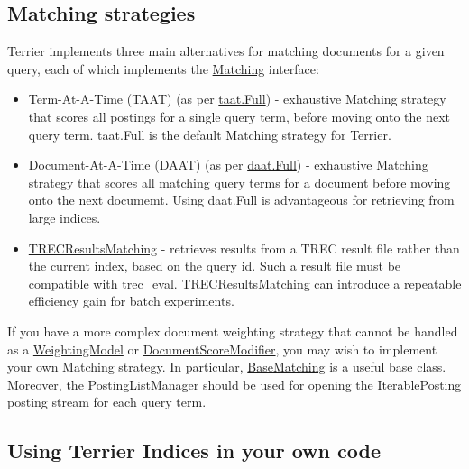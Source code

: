 \subsection{Matching strategies}\label{matching-strategies}

Terrier implements three main alternatives for matching documents for a
given query, each of which implements the
\href{javadoc/org/terrier/matching/Matching.html}{Matching} interface:

\begin{itemize}
\tightlist
\item
  Term-At-A-Time (TAAT) (as per
  \href{javadoc/org/terrier/matching/taat/Full.html}{taat.Full}) -
  exhaustive Matching strategy that scores all postings for a single
  query term, before moving onto the next query term. taat.Full is the
  default Matching strategy for Terrier.
\item
  Document-At-A-Time (DAAT) (as per
  \href{javadoc/org/terrier/matching/daat/Full.html}{daat.Full}) -
  exhaustive Matching strategy that scores all matching query terms for
  a document before moving onto the next documemt. Using daat.Full is
  advantageous for retrieving from large indices.
\item
  \href{javadoc/org/terrier/matching/TRECResultsMatching.html}{TRECResultsMatching}
  - retrieves results from a TREC result file rather than the current
  index, based on the query id. Such a result file must be compatible
  with \href{http://trec.nist.gov/trec_eval}{trec\_eval}.
  TRECResultsMatching can introduce a repeatable efficiency gain for
  batch experiments.
\end{itemize}

If you have a more complex document weighting strategy that cannot be
handled as a
\href{javadoc/org/terrier/matching/models/WeightingModel.html}{WeightingModel}
or
\href{javadoc/org/terrier/matching/dsms/DocumentScoreModifier.html}{DocumentScoreModifier},
you may wish to implement your own Matching strategy. In particular,
\href{javadoc/org/terrier/matching/BaseMatching.html}{BaseMatching} is a
useful base class. Moreover, the
\href{javadoc/org/terrier/matching/PostingListManager.html}{PostingListManager}
should be used for opening the
\href{javadoc/org/terrier/structures/postings/IterablePosting.html}{IterablePosting}
posting stream for each query term.

\subsection{Using Terrier Indices in your own
code}\label{using-terrier-indices-in-your-own-code}

